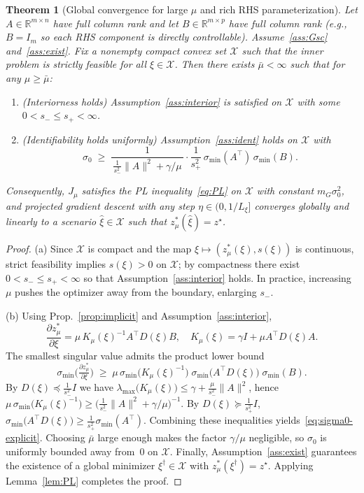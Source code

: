 \documentclass[11pt]{article}
\newtheorem{theorem}{Theorem}
\theoremstyle{remark}
\begin{document}
\begin{theorem}[Global convergence for large $\mu$ and rich RHS parameterization]
\label{thm:global}
Let $A\in\mathbb{R}^{m\times n}$ have full column rank and let $B\in\mathbb{R}^{m\times p}$ have full column rank (e.g., $B=I_m$ so each RHS component is directly controllable).
Assume~\ref{ass:Gsc} and~\ref{ass:exist}.
Fix a nonempty compact convex set $\mathcal{X}$ such that the inner problem is strictly feasible for all $\xi\in\mathcal{X}$.
Then there exists $\bar\mu<\infty$ such that for any $\mu\ge \bar\mu$:
\begin{enumerate}[leftmargin=2em,label=(\alph*)]
\item (Interiorness holds) Assumption~\ref{ass:interior} is satisfied on $\mathcal{X}$ with some $0<s_-\le s_+<\infty$.
\item (Identifiability holds uniformly) Assumption~\ref{ass:ident} holds on $\mathcal{X}$ with
\begin{equation}
\label{eq:sigma0-explicit}
\sigma_0
\;\ge\;
\frac{1}{\,\tfrac{1}{s_-^2}\|A\|^2+\gamma/\mu\,}\cdot \frac{1}{s_+^2}\,\sigma_{\min}(A^\top)\,\sigma_{\min}(B).
\end{equation}
\end{enumerate}
Consequently, $J_\mu$ satisfies the PL inequality~\eqref{eq:PL} on $\mathcal{X}$ with constant $m_G\sigma_0^2$, and projected gradient descent with any step $\eta\in(0,1/L_\xi]$ converges globally and linearly to a scenario $\hat\xi\in\mathcal{X}$ such that $z^*_\mu(\hat\xi)=z^\star$.
\end{theorem}

\begin{proof}
(a) Since $\mathcal{X}$ is compact and the map $\xi\mapsto (z^*_\mu(\xi),s(\xi))$ is continuous, strict feasibility implies $s(\xi)>0$ on $\mathcal{X}$; by compactness there exist $0<s_-\le s_+<\infty$ so that Assumption~\ref{ass:interior} holds. In practice, increasing $\mu$ pushes the optimizer away from the boundary, enlarging $s_-$.

(b) Using Prop.~\ref{prop:implicit} and Assumption~\ref{ass:interior},
\[
\frac{\partial z^*_\mu}{\partial \xi}
=
\mu\,K_\mu(\xi)^{-1} A^\top D(\xi) B,
\quad
K_\mu(\xi)=\gamma I + \mu A^\top D(\xi) A .
\]
The smallest singular value admits the product lower bound
\[
\sigma_{\min}\!\Big(\tfrac{\partial z^*_\mu}{\partial \xi}\Big)
\;\ge\;
\mu \,\sigma_{\min}\!\big(K_\mu(\xi)^{-1}\big)\;
\sigma_{\min}\!\big(A^\top D(\xi)\big)\;
\sigma_{\min}(B).
\]
By $D(\xi)\preceq \tfrac{1}{s_-^2}I$ we have
$\lambda_{\max}\!\big(K_\mu(\xi)\big) \le \gamma + \tfrac{\mu}{s_-^2}\|A\|^2$,
hence
\(
\mu \,\sigma_{\min}\!\big(K_\mu(\xi)^{-1}\big) \ge
\Big(\tfrac{1}{s_-^2}\|A\|^2+\gamma/\mu\Big)^{-1}.
\)
By $D(\xi)\succeq \tfrac{1}{s_+^2} I$,
\(
\sigma_{\min}\!\big(A^\top D(\xi)\big)\ge \tfrac{1}{s_+^2}\sigma_{\min}(A^\top).
\)
Combining these inequalities yields~\eqref{eq:sigma0-explicit}.
Choosing $\bar\mu$ large enough makes the factor $\gamma/\mu$ negligible, so $\sigma_0$ is uniformly bounded away from~$0$ on $\mathcal{X}$.
Finally, Assumption~\ref{ass:exist} guarantees the existence of a global minimizer $\xi^\dagger\in\mathcal{X}$ with $z^*_\mu(\xi^\dagger)=z^\star$.
Applying Lemma~\ref{lem:PL} completes the proof.
\end{proof}
\end{document}

